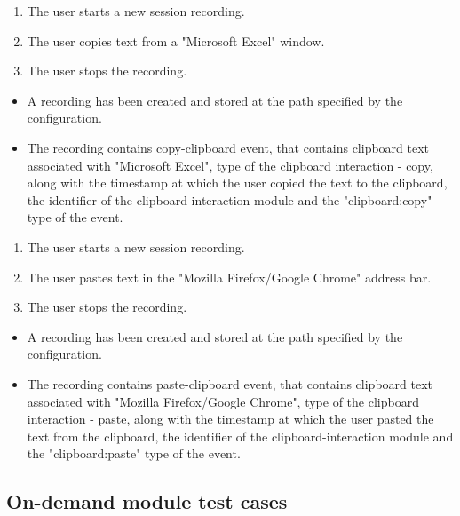\begin{tests}
	{\begin{enumerate}
		\item The \gls{user} starts a new session recording.
		\item The \gls{user} copies text from a "Microsoft Excel" window.
		\item The \gls{user} stops the recording.
	\end{enumerate}}
	{\begin{itemize}
		\item A recording has been created and stored at the path specified by the configuration.
		\item The recording contains copy-clipboard event, that contains clipboard text associated with "Microsoft Excel", type of the clipboard interaction - copy, along with the timestamp at which the user copied the text to the clipboard, the identifier of the clipboard-interaction module and the "clipboard:copy" type of the event.
	\end{itemize}}
	
	{\begin{enumerate}
		\item The \gls{user} starts a new session recording.
		\item The \gls{user} pastes text in the "Mozilla Firefox/Google Chrome" address bar.
		\item The \gls{user} stops the recording.
	\end{enumerate}}
	{\begin{itemize}
		\item A recording has been created and stored at the path specified by the configuration.
		\item The recording contains paste-clipboard event, that contains clipboard text associated with "Mozilla Firefox/Google Chrome", type of the clipboard interaction - paste, along with the timestamp at which the user pasted the text from the clipboard, the identifier of the clipboard-interaction module and the "clipboard:paste" type of the event.
	\end{itemize}}
\end{tests}

\subsection{On-demand module test cases}

